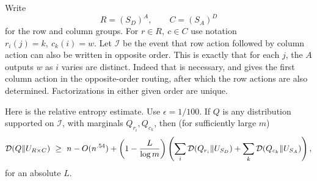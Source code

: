 Write
\[
 R=(S_D)^A,\qquad C=(S_A)^D
\]
for the row and column groups. For \(r\in R,\ c\in C\) use notation \(r_i(j)=k,\ c_k(i)=w\). Let \(\mathcal I\) be the event that row action followed by column action can also be written in opposite order. This is exactly that for each \(j\), the \(A\) outputs \(w\) as \(i\) varies are distinct. Indeed that is necessary, and gives the first column action in the opposite-order routing, after which the row actions are also determined. Factorizations in either given order are unique.
\begin{proposition}\label{tra:duality:entropy}
\label{tra:duality:entropy-statement}
Here is the relative entropy estimate. Use \(\epsilon=1/100\). If \(Q\) is any distribution supported on \(\mathcal I\), with marginals \(Q_{r_i},Q_{c_k}\), then (for sufficiently large \(m\))
\begin{equation}
 {\cal D}(Q\|U_{R\times C})\ \ge\
 n-O(n^{.54})
 +\left(1-\frac{L}{\log m}\right)
   \left(\sum_i{\cal D}(Q_{r_i}\|U_{S_D})
                +\sum_k {\cal D}(Q_{c_k}\|U_{S_A})\right),       \label{tra:duality:eq2}
\end{equation}
for an absolute \(L\).
\end{proposition}
